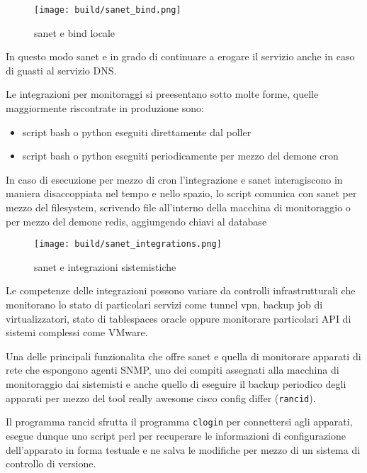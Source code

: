 \documentclass[12pt,a4paper,twoside,openright]{book}
\begin{document}
\begin{figure}[H]
    \centering
    \texttt{[image: build/sanet\_bind.png]}
    \caption{sanet e bind locale}
    \label{fig:enter-label}
\end{figure}

In questo modo sanet e in grado di continuare a erogare il servizio anche in caso di guasti al servizio DNS.

Le integrazioni per monitoraggi si preesentano sotto molte forme, quelle maggiormente riscontrate in produzione sono:

\begin{itemize}
  \item{script bash o python eseguiti direttamente dal poller}
  \item{script bash o python eseguiti periodicamente per mezzo del demone cron}
\end{itemize}

In caso di esecuzione per mezzo di cron l'integrazione e sanet interagiscono in maniera disaccoppiata nel tempo e nello spazio, lo script comunica con sanet per mezzo del filesystem, scrivendo file all'interno della macchina di monitoraggio o per mezzo del demone redis, aggiungendo chiavi al database

\begin{figure}[H]
    \centering
    \texttt{[image: build/sanet\_integrations.png]}
    \caption{sanet e integrazioni sistemistiche}
    \label{fig:enter-label}
\end{figure}

Le competenze delle integrazioni possono variare da controlli infrastrutturali che monitorano lo stato di particolari servizi come tunnel vpn, backup job di virtualizzatori, stato di tablespaces oracle oppure monitorare particolari API di sistemi complessi come VMware.

Una delle principali funzionalita che offre sanet e quella di monitorare apparati di rete che espongono agenti SNMP, uno dei compiti assegnati alla macchina di monitoraggio dai sistemisti e anche quello di eseguire il backup periodico degli apparati per mezzo del tool really awesome cisco config differ (\verb|rancid|).

Il programma rancid sfrutta il programma \verb|clogin| per connettersi agli apparati, esegue dunque uno script perl per recuperare le informazioni di configurazione dell'apparato in forma testuale e ne salva le modifiche per mezzo di un sistema di controllo di versione.
\end{document}
